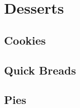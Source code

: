 \documentclass[twoside, openany]{book}
\newcommand{\dish}[1]{}
\begin{document}
\dish{Nut_dip}

\dish{Pumpkin_butter}







\chapter{Desserts}


\section{Cookies}

\dish{Brown_butter_chocolate_chip_cookies}

\dish{C4_cookies}

\dish{Gingerbread}

\dish{Lebkuchen}

\dish{Pride_of_iowa}

\dish{Pride_of_iowa_refrigerator}

\dish{Pumpkin_cookies}

\dish{Snickerdoodles}

\dish{Sugar_cookies}

\dish{Chocolate_peanut_tartlets}


\section{Quick Breads}

\dish{Banana_bread}

\dish{Orange_bread}

\dish{Pumpkin_bread}

\dish{Rhubarb_coffee_cake}

\dish{Scones}

\dish{Ginger_biscuits}

\dish{Pumpkin_walnut_muffins}

\dish{Blueberry_walnut_muffins}

\dish{Red_velvet_brownies}

\dish{Fudgy_brownies}

\dish{Lembas}

\dish{Nutella_brownies}

\dish{Raspberry_scones}


\section{Pies}
\end{document}
